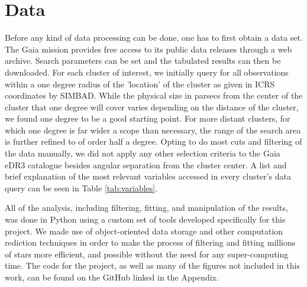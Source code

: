 \documentclass[onecolumn,table,xcdraw,super]{aastex631}
\begin{document}
\section{Data} \label{sec:data}

Before any kind of data processing can be done, one has to first obtain a data set. The Gaia mission provides free access to its public data releases through a web archive. Search parameters can be set and the tabulated results can then be downloaded. For each cluster of interest, we initially query for all observations within a one degree radius of the 'location' of the cluster as given in ICRS coordinates by SIMBAD. While the physical size in parsecs from the center of the cluster that one degree will cover varies depending on the distance of the cluster, we found one degree to be a good starting point. For more distant clusters, for which one degree is far wider a scope than necessary, the range of the search area is further refined to of order half a degree. Opting to do most cuts and filtering of the data manually, we did not apply any other selection criteria to the Gaia eDR3 catalogue besides angular separation from the cluster center. A list and brief explanation of the most relevant variables accessed in every cluster's data query can be seen in Table \ref{tab:variables}.

All of the analysis, including filtering, fitting, and manipulation of the results, was done in Python using a custom set of tools developed specifically for this project. We made use of object-oriented data storage and other computation rediction techniques in order to make the process of filtering and fitting millions of stars more efficient, and possible without the need for any super-computing time. The code for the project, as well as many of the figures not included in this work,  can be found on the GitHub linked in the Appendix.
\end{document}
